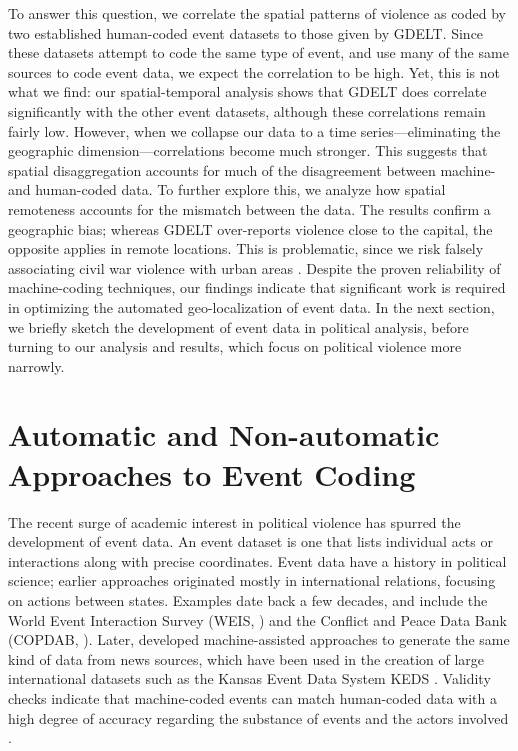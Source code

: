 \documentclass[hidelinks]{article}
\begin{document}
To answer this question, we correlate the spatial patterns of violence as coded by two established human-coded event datasets to those given by GDELT. Since these datasets attempt to code the same type of event, and use many of the same sources to code event data, we expect the correlation to be high. Yet, this is not what we find: our spatial-temporal analysis shows that GDELT does correlate significantly with the other event datasets, although these correlations remain fairly low. However, when we collapse our data to a time series---eliminating the geographic dimension---correlations become much stronger. This suggests that spatial disaggregation accounts for much of the disagreement between machine- and human-coded data. To further explore this, we analyze how spatial remoteness accounts for the mismatch between the data. The results confirm a geographic bias; whereas GDELT over-reports violence close to the capital, the opposite applies in remote locations. This is problematic, since we risk falsely associating civil war violence with urban areas \citep{kalyvas04urban}. Despite the proven reliability of machine-coding techniques, our findings indicate that significant work is required in optimizing the automated geo-localization of event data. In the next section, we briefly sketch the development of event data in political analysis, before turning to our analysis and results, which focus on political violence more narrowly.

\section*{Automatic and Non-automatic Approaches to Event Coding}

The recent surge of academic interest in political violence has spurred the development of event data. An event dataset is one that lists individual acts or interactions along with precise coordinates. Event data have a history in political science; earlier approaches originated mostly in international relations, focusing on actions between states. Examples date back a few decades, and include the World Event Interaction Survey (WEIS, \citealt{mcclelland71world}) and the Conflict and Peace Data Bank (COPDAB, \citealt{azar80conflict}). Later, \citet{schrodt94keds} developed machine-assisted approaches to generate the same kind of data from news sources, which have been used in the creation of large international datasets such as the Kansas Event Data System KEDS \citep{gerner94machine}. Validity checks indicate that machine-coded events can match human-coded data with a high degree of accuracy regarding the substance of events and the actors involved \citep{schrodt94validity, best13tabari}.
\end{document}
